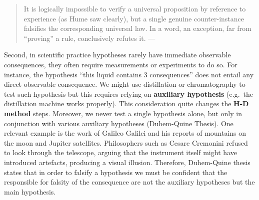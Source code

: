 \documentclass[
]{book}
\begin{document}
\begin{quote}
It is logically impossible to verify a universal proposition by reference to experience (as Hume saw clearly), but a single genuine counter-instance falsifies the corresponding universal law. In a word, an exception, far from ``proving'' a rule, conclusively refutes it. --- \citep{sep-popper}
\end{quote}

Second, in scientific practice hypotheses rarely have immediate observable consequences, they often require measurements or experiments to do so. For instance, the hypothesis ``this liquid contains 3 consequences'' does not entail any direct observable consequence. We might use distillation or chromatography to test such hypothesis but this requires relying on \textbf{auxiliary hypothesis} (e.g.~the distillation machine works properly). This consideration quite changes the \textbf{H-D method} steps. Moreover, we never test a single hypothesis alone, but only in conjunction with various auxiliary hypotheses (Duhem-Quine Thesis). One relevant example is the work of Galileo Galilei and his reports of mountains on the moon and Jupiter satellites. Philosophers such as Cesare Cremonini refused to look through the telescope, arguing that the instrument itself might have introduced artefacts, producing a visual illusion. Therefore, Duhem-Quine thesis states that in order to falsify a hypothesis we must be confident that the responsible for falsity of the consequence are not the auxiliary hypotheses but the main hypothesis.
\end{document}
